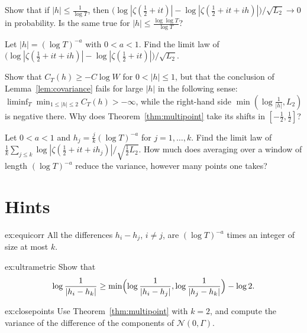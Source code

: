 \begin{exercise}[$\star$]\label{ex:closepoints}
Show that if $|h|\le\frac1{\log T}$, then $\bigl(\log|\zeta(\frac12+it)|-\log|\zeta(\frac12+it+ih)|\bigr)/\sqrt{L_2}\to0$ in probability. Is the same true for $|h|\le\frac{\log\log T}{\log T}$?
\end{exercise}

\begin{exercise}[$\star\star$]\label{ex:increment}
Let $|h|=(\log T)^{-a}$ with $0<a<1$. Find the limit law of $\bigl(\log|\zeta(\frac12+it+ih)|-\log|\zeta(\frac12+it)|\bigr)/\sqrt{L_2}$.
\end{exercise}

\begin{exercise}[$\star\star$]\label{ex:negcov}
Show that $C_T(h)\ge-C\log W$ for $0<|h|\le1$, but that the conclusion of Lemma~\ref{lem:covariance} fails for large $|h|$ in the following sense: $\liminf_{T}\min_{1\le|h|\le2}C_T(h)>-\infty$, while the right-hand side $\min(\log\frac1{|h|},L_2)$ is negative there. Why does Theorem~\ref{thm:multipoint} take its shifts in $[-\frac12,\frac12]$?
\end{exercise}

\begin{exercise}[$\star$]\label{ex:smoothing}
Let $0<a<1$ and $h_j=\frac jk(\log T)^{-a}$ for $j=1,\dots,k$. Find the limit law of $\frac1k\sum_{j\le k}\log|\zeta(\frac12+it+ih_j)|/\sqrt{\frac12L_2}$. How much does averaging over a window of length $(\log T)^{-a}$ reduce the variance, however many points one takes?
\end{exercise}

\section{Hints}

\begin{hint}{ex:equicorr}
All the differences $h_i-h_j$, $i\ne j$, are $(\log T)^{-a}$ times an integer of size at most $k$.
\end{hint}

\begin{hint}{ex:ultrametric}
Show that
\[
\log\frac1{|h_i-h_k|}\ge\min\Bigl(\log\frac1{|h_i-h_j|},\log\frac1{|h_j-h_k|}\Bigr)-\log2.
\]
\end{hint}

\begin{hint}{ex:closepoints}
Use Theorem~\ref{thm:multipoint} with $k=2$, and compute the variance of the difference of the components of $\mathcal N(0,\Gamma)$.
\end{hint}

